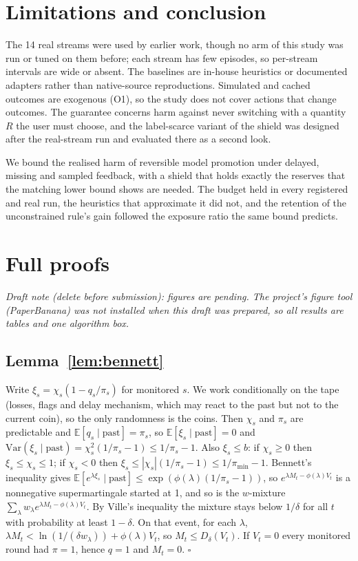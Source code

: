 \documentclass{article}
\theoremstyle{plain}
\theoremstyle{definition}
\newcommand{\E}{\mathbb{E}}
\begin{document}
\section{Limitations and conclusion}
The 14 real streams were used by earlier work, though no arm of this study was run or tuned on them before; each stream has few episodes, so per-stream intervals are wide or absent. The baselines are in-house heuristics or documented adapters rather than native-source reproductions. Simulated and cached outcomes are exogenous (O1), so the study does not cover actions that change outcomes. The guarantee concerns harm against never switching with a quantity $R$ the user must choose, and the label-scarce variant of the shield was designed after the real-stream run and evaluated there as a second look.

We bound the realised harm of reversible model promotion under delayed, missing and sampled feedback, with a shield that holds exactly the reserves that the matching lower bound shows are needed. The budget held in every registered and real run, the heuristics that approximate it did not, and the retention of the unconstrained rule's gain followed the exposure ratio the same bound predicts.




\newpage
\appendix
\onecolumn
\section{Full proofs}\label{app:proofs}
\emph{Draft note (delete before submission): figures are pending. The project's figure tool (PaperBanana) was not installed when this draft was prepared, so all results are tables and one algorithm box.}

\subsection{Lemma~\ref{lem:bennett}}
Write $\xi_s=\chi_s(1-q_s/\pi_s)$ for monitored $s$. We work conditionally on the tape (losses, flags and delay mechanism, which may react to the past but not to the current coin), so the only randomness is the coins. Then $\chi_s$ and $\pi_s$ are predictable and $\E[q_s\mid\text{past}]=\pi_s$, so $\E[\xi_s\mid\text{past}]=0$ and $\mathrm{Var}(\xi_s\mid\text{past})=\chi_s^2(1/\pi_s-1)\le1/\pi_s-1$. Also $\xi_s\le b$: if $\chi_s\ge0$ then $\xi_s\le\chi_s\le1$; if $\chi_s<0$ then $\xi_s\le|\chi_s|(1/\pi_s-1)\le1/\pi_{\min}-1$. Bennett's inequality gives $\E[e^{\lambda\xi_s}\mid\text{past}]\le\exp(\phi(\lambda)(1/\pi_s-1))$, so $e^{\lambda M_t-\phi(\lambda)V_t}$ is a nonnegative supermartingale started at 1, and so is the $w$-mixture $\sum_\lambda w_\lambda e^{\lambda M_t-\phi(\lambda)V_t}$. By Ville's inequality the mixture stays below $1/\delta$ for all $t$ with probability at least $1-\delta$. On that event, for each $\lambda$, $\lambda M_t<\ln(1/(\delta w_\lambda))+\phi(\lambda)V_t$, so $M_t\le D_\delta(V_t)$. If $V_t=0$ every monitored round had $\pi=1$, hence $q=1$ and $M_t=0$. $\square$
\end{document}
